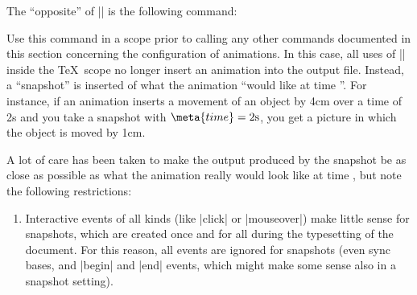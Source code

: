 The ``opposite'' of |\pgfsysanimate| is the following command:

\begin{command}{\pgfsysanimsnapshot{}}
    Use this command in a scope prior to calling any other commands documented
    in this section concerning the configuration of animations. In this case,
    all uses of |\pgfsysanimate| inside the \TeX\ scope no longer insert an
    animation into the output file. Instead, a ``snapshot'' is inserted of what
    the animation ``would like at time ''. For instance, if an
    animation inserts a movement of an object by 4cm over a time of 2s and you
    take a snapshot with $\meta{time} = 2\mathrm s$, you get a picture in which
    the object is moved by 1cm.

    A lot of care has been taken to make the output produced by the snapshot be
    as close as possible as what the animation really would look like at time
    , but note the following restrictions:
    \begin{enumerate}
        \item Interactive events of all kinds (like |click| or |mouseover|)
            make little sense for snapshots, which are created once and for all
            during the typesetting of the document. For this reason, all events
            are ignored for snapshots (even sync bases, and |begin| and |end|
            events, which might make some sense also in a snapshot setting).


\end{enumerate}
\end{command}
